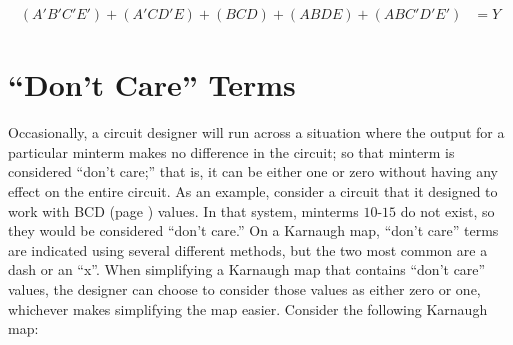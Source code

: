 \begin{align}
  \label{KM:eq:k-map_five_variables_ex_2_simplified}
  (A'B'C'E')+(A'CD'E)+(BCD)+(ABDE)+(ABC'D'E') &= Y
\end{align}

\section{``Don't Care'' Terms}
\label{KM:sec:dont_care_terms}

Occasionally, a circuit designer will run across a situation where the output for a particular minterm makes no difference in the circuit; so that minterm is considered ``don't care;'' that is, it can be either one or zero without having any effect on the entire circuit. As an example, consider a circuit that it designed to work with \ac{BCD} (page \pageref{MO:subsub:binary_coded_decimal}) values. In that system, minterms $ 10 $-$ 15 $ do not exist, so they would be considered ``don't care.'' On a Karnaugh map, ``don't care'' terms are indicated using several different methods, but the two most common are a dash or an ``x''.  When simplifying a Karnaugh map that contains ``don't care'' values, the designer can choose to consider those values as either zero or one, whichever makes simplifying the map easier. Consider the following Karnaugh map:

